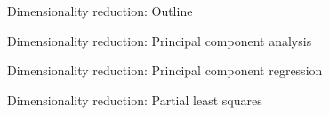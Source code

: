 \documentclass[8pt]{beamer}
\begin{document}
    \begin{frame}{Dimensionality reduction: Outline}
    \end{frame}

    \begin{frame}{Dimensionality reduction: Principal component analysis}
    \end{frame}

    \begin{frame}{Dimensionality reduction: Principal component regression}
    \end{frame}

    \begin{frame}{Dimensionality reduction: Partial least squares}
    \end{frame}
\end{document}

